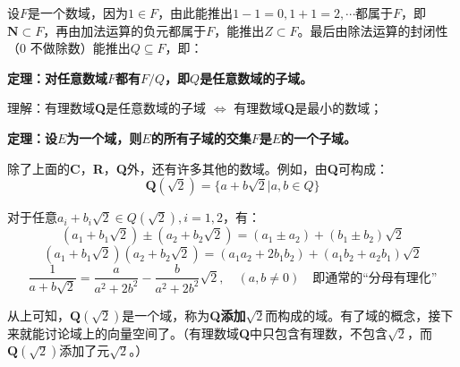 \documentclass[12pt]{article}
\begin{document}
设$F$是一个数域，因为$1 \in F$，由此能推出$1 - 1 = 0, 1 + 1 = 2, \cdots$都属于$F$，即$\textbf{N} \subset F$，再由加法运算的负元都属于$F$，能推出$Z \subset F$。最后由除法运算的封闭性（0 不做除数）能推出$Q \subseteq F$，即：
\begin{mdframed}[
linecolor=black!40,outerlinewidth=1pt,roundcorner=.5em,innertopmargin=1ex,innerbottommargin=.5\baselineskip,innerrightmargin=1em,innerleftmargin=1em,backgroundcolor=gray!5,
]
\textbf{
定理：对任意数域$F$都有$F/Q$，即$Q$是任意数域的子域。
}

\small{
理解：有理数域\textbf{Q}是任意数域的子域 $\Leftrightarrow$ 有理数域\textbf{Q}是最小的数域；
}
\end{mdframed}

\begin{mdframed}[
linecolor=black!40,outerlinewidth=1pt,roundcorner=.5em,innertopmargin=1ex,innerbottommargin=.5\baselineskip,innerrightmargin=1em,innerleftmargin=1em,backgroundcolor=gray!5,
]
\textbf{
定理：设$E$为一个域，则$E$的所有子域的交集$F$是$E$的一个子域。
}
\end{mdframed}

除了上面的\textbf{C}，\textbf{R}，\textbf{Q}外，还有许多其他的数域。例如，由\textbf{Q}可构成：
$$
\textbf{Q}(\sqrt{2}) = \{a + b\sqrt{2}|a, b \in Q\}
$$

对于任意$a_i + b_i\sqrt{2} \in Q(\sqrt{2}), i = 1, 2$，有：
$$
(a_1 + b_1\sqrt{2}) \pm (a_2 + b_2\sqrt{2}) = (a_1 \pm a_2) + (b_1 \pm b_2)\sqrt{2}
$$
$$ (a_1 + b_1\sqrt{2})(a_2 + b_2\sqrt{2}) = (a_1a_2 + 2b_1b_2) + (a_1b_2 + a_2b_1)\sqrt{2}
$$
$$
\frac{1}{a + b\sqrt{2}} = \frac{a}{a^2+2b^2} - \frac{b}{a^2+2b^2}\sqrt{2}, \quad(a, b \neq 0)\quad\text{即通常的“分母有理化”}
$$

从上可知，$\textbf{Q}(\sqrt{2})$是一个域，称为\textbf{Q}\textbf{添加}$\sqrt{2}$而构成的域。有了域的概念，接下来就能讨论域上的向量空间了。（有理数域\textbf{Q}中只包含有理数，不包含$\sqrt{2}$，而$\textbf{Q}(\sqrt{2})$添加了元$\sqrt{2}$。）
\end{document}
